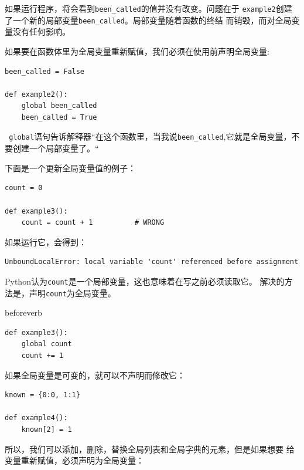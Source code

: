 如果运行程序，将会看到\verb"been_called"的值并没有改变。问题在于
{\tt example2}创建了一个新的局部变量\verb"been_called"。局部变量随着函数的终结
而销毁，而对全局变量没有任何影响。


如果要在函数体里为全局变量重新赋值，我们必须在使用前声明全局变量:

\beforeverb
\begin{verbatim}
been_called = False

def example2():
    global been_called 
    been_called = True
\end{verbatim}
\afterverb

{\tt
	global}语句告诉解释器“在这个函数里，当我说\verb"been_called",它就是全局变量，不要创建一个局部变量了。“


下面是一个更新全局变量值的例子：

\beforeverb
\begin{verbatim}
count = 0

def example3():
    count = count + 1          # WRONG
\end{verbatim}
\afterverb
如果运行它，会得到：


\beforeverb
\begin{verbatim}
UnboundLocalError: local variable 'count' referenced before assignment
\end{verbatim}
\afterverb
Python认为{\tt count}是一个局部变量，这也意味着在写之前必须读取它。
解决的方法是，声明{\tt count}为全局变量。


beforeverb
\begin{verbatim}
def example3():
    global count
    count += 1
\end{verbatim}
\afterverb
%

如果全局变量是可变的，就可以不声明而修改它：


\beforeverb
\begin{verbatim}
known = {0:0, 1:1}

def example4():
    known[2] = 1
\end{verbatim}
\afterverb
%

所以，我们可以添加，删除，替换全局列表和全局字典的元素，但是如果想要
给变量重新赋值，必须声明为全局变量：

